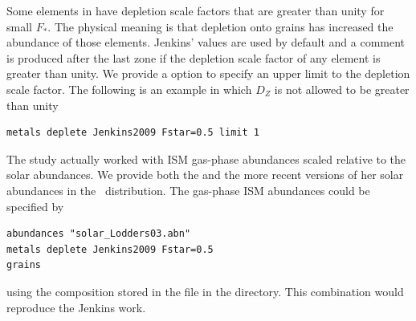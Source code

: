 Some elements in  \citet{2009ApJ...700.1299J}  have depletion scale factors that are
greater than unity for small $F_*$.  The physical meaning is that depletion onto grains
has increased the abundance of those elements.
Jenkins' values are used by default and a comment is produced 
after the last zone if the depletion scale factor of any element is greater than unity.  
We provide a  option to specify an upper limit to the depletion scale factor.
The following is an example in which $D_Z$ is not allowed to be greater than unity
\begin{verbatim}
metals deplete Jenkins2009 Fstar=0.5 limit 1
\end{verbatim}

The \citet{2009ApJ...700.1299J}   study actually worked with ISM gas-phase abundances scaled
relative to the \citet{Lodders2003} solar abundances.
We provide both the \citet{Lodders2003} and the more recent \citet{Lodders2009} versions of her solar abundances 
in the \Cloudy\ distribution.  
The \citet{Lodders2003} gas-phase ISM abundances could be specified by 
\begin{verbatim}
abundances "solar_Lodders03.abn"
metals deplete Jenkins2009 Fstar=0.5
grains
\end{verbatim}
using the composition stored in the  file 
in the  directory.
This combination would reproduce the Jenkins work.
